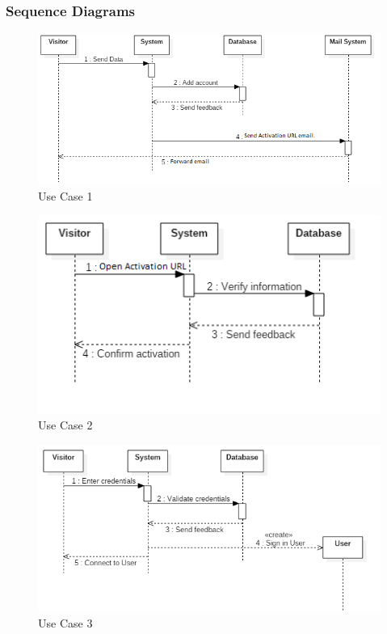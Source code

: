 \subsubsection{Sequence Diagrams}
\begin{figure}[h]
\centering
\includegraphics[width=\linewidth,keepaspectratio]{../Diagrams/SD/UC_1.png}
\caption{Use Case 1}
\end{figure}
\FloatBarrier
\begin{figure}[h]
\centering
\includegraphics[width=\linewidth,keepaspectratio]{../Diagrams/SD/UC_2.png}
\caption{Use Case 2}
\end{figure}
\FloatBarrier
\begin{figure}[h]
\centering
\includegraphics[width=\linewidth,keepaspectratio]{../Diagrams/SD/UC_3.png}
\caption{Use Case 3}
\end{figure}

